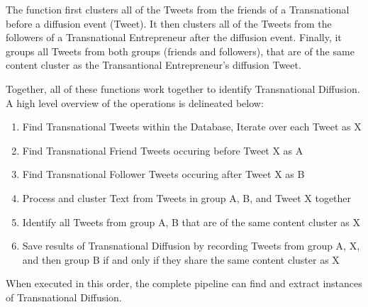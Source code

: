 The function first clusters all of the Tweets from the friends of a
Transnational before a diffusion event (Tweet). It then clusters all
of the Tweets from the followers of a Transnational Entrepreneur after
the diffusion event. Finally, it groups all Tweets from both groups
(friends and followers), that are of the same content cluster as the
Transantional Entrepreneur's diffusion Tweet.

Together, all of these functions work together to identify
Transnational Diffusion. A high level overview of the operations is
delineated below:

\begin{enumerate}
\item Find Transnational Tweets within the Database, Iterate over each
  Tweet as X
\item Find Transnational Friend Tweets occuring before Tweet X as A
\item Find Transnational Follower Tweets occuring after Tweet X as B
\item Process and cluster Text from Tweets in group A, B, and Tweet X together
\item Identify all Tweets from group A, B that are of the same content cluster as X
\item Save results of Transnational Diffusion by recording Tweets from
  group A, X, and then group B if and only if they share the same
  content cluster as X
\end{enumerate}

When executed in this order, the complete pipeline can find and
extract instances of Transnational Diffusion.
